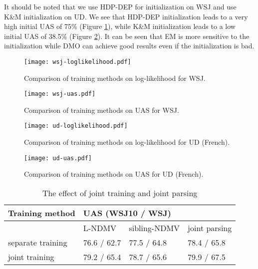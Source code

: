 \documentclass[11pt]{article}
\begin{document}
It should be noted that we use HDP-DEP \cite{Naseem2010UsingUL} for initialization on WSJ and use K\&M initialization \cite{Klein2004CorpusBasedIO} on UD. We see that HDP-DEP initialization leads to a very high initial UAS of 75\% (Figure \ref{wsj_uas}),
while K\&M initialization leads to a low initial UAS of 38.5\% (Figure \ref{ud_uas}). It can be seen that EM is more sensitive to the initialization while DMO can achieve good results even if the initialization is bad. 

\begin{figure}[tbp] 
\centering
  \begin{minipage}[b]{0.45\linewidth}
    \centering
        \texttt{[image: wsj-loglikelihood.pdf]} 
    \caption{Comparison of training methods on log-likelihood for WSJ.} 
          \label{wsj_likelihood} 
    \vspace{0ex}
  \end{minipage}\hspace*{2em}
  \begin{minipage}[b]{0.45\linewidth}
    \centering
    \texttt{[image: wsj-uas.pdf]} 
    \caption{Comparison of training methods on UAS for WSJ.} 
      \label{wsj_uas} 
    \vspace{0ex}
  \end{minipage} 
\end{figure}

\begin{figure}[tbp] 
\centering
  \begin{minipage}[b]{0.45\linewidth}
    \centering
    \texttt{[image: ud-loglikelihood.pdf]}
    \caption{Comparison of training methods on log-likelihood for UD (French).}
    \label{ud-likelihood}
  \end{minipage}\hspace*{2em}
  \begin{minipage}[b]{0.45\linewidth}
    \centering
\texttt{[image: ud-uas.pdf]} 
    \caption{Comparison of training methods on UAS for UD (French).} 
     \label{ud_uas} 
  \end{minipage} 
\end{figure}

\begin{table}[tb]
\centering
\small
\begin{tabular}{l|l|l|l}
\hline
Training method   & \multicolumn{3}{l|}{UAS  (WSJ10 / WSJ)} \\ \hline
                  & L-NDMV         & sibling-NDMV   & joint parsing   \\ \hline
separate training & 76.6 / 62.7    & 77.5 / 64.8    & 78.4 / 65.8      \\ \hline
joint training    & 79.2 / 65.4    & 78.7 / 65.6    & 79.9 / 67.5      \\ \hline
\end{tabular}
\caption{The effect of joint training and joint parsing}
\label{joint-decoding}
\end{table}
\end{document}
